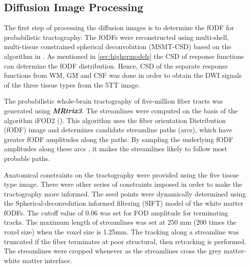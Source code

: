 \documentclass[msthesis.tex]{subfiles}
\begin{document}
\subsection{Diffusion Image Processing}
\label{sec:Diffusionimgprepro}
The first step of processing the diffusion images is to determine the fODF for probabilistic tractography. The fODFs were reconstructed using multi-shell, multi-tissue constrained spherical deconvolution (MSMT-CSD) based on the algorithm in \cite{jeurissen2014multi}. As mentioned in  \autoref{sec:highermodels} the CSD of response functions can determine the fODF distribution. Hence, CSD of the separate response functions from WM, GM and CSF was done in order to obtain the DWI signals of the three tissue types from the 5TT image.

The probabilistic whole-brain tractography of five-million fiber tracts was generated using \textbf{\textit{MRtrix3}}. The streamlines were computed on the basis of the algorithm iFOD2 (\cite{tournier2010improved}). This algorithm uses the fiber orientation Distribution (fODF) image and determines candidate streamline paths (arcs), which have greater fODF amplitudes along the paths. By sampling the underlying fODF amplitudes along these arcs , it makes the streamlines likely to follow most probable paths.

Anatomical constraints on the tractography were provided using the five tissue type image. There were other series of constraints imposed in order to make the  tractography more informed. The seed points were dynamically determined using the Spherical-deconvolution informed filtering (SIFT) model \cite{smith2013sift} of the white matter fODFs. The cutoff value of 0.06 was set for FOD amplitude for terminating tracks. The maximum length of streamlines was set at 250 mm (200 times the voxel size) when the voxel size is 1.25mm. The tracking along a streamline was truncated if the fiber terminates at poor structural, then  retracking is performed. The streamlines were cropped whenever as the streamlines cross the grey matter-white matter interface. 
\end{document}
